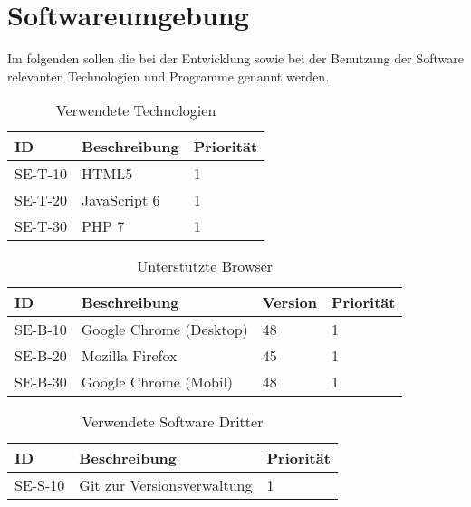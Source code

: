 
\chapter{Softwareumgebung}
Im folgenden sollen die bei der Entwicklung sowie bei der Benutzung der Software relevanten Technologien und Programme genannt werden.

\begin{table}[H]
\caption{Verwendete Technologien}
\label{softwareumgebung:technologien}
\begin{tabularx}{\textwidth}{|l|X|l|}
\toprule
\textbf{ID} & \textbf{Beschreibung} & \textbf{Priorität}\\
\endhead
\hline
SE-T-10 & HTML5 & 1 \\
SE-T-20 & JavaScript 6 & 1 \\
SE-T-30 & PHP 7 & 1\\
\hline
\end{tabularx}
\end{table}

\begin{table}[H]
\caption{Unterstützte Browser}
\label{softwareumgebung:browser}
\begin{tabularx}{\textwidth}{|l|l|l|l|}
\toprule
\textbf{ID} & \textbf{Beschreibung} & \textbf{Version} & \textbf{Priorität}\\
\endhead
\hline
SE-B-10 & Google Chrome (Desktop) & 48 & 1 \\
SE-B-20 & Mozilla Firefox & 45 & 1 \\
SE-B-30 & Google Chrome (Mobil) & 48 & 1\\
\hline
\end{tabularx}
\end{table}

\begin{table}[H]
\caption{Verwendete Software Dritter}
\label{softwareumgebung:sonstige}
\begin{tabularx}{\textwidth}{|l|X|l|}
\toprule
\textbf{ID} & \textbf{Beschreibung} & \textbf{Priorität}\\
\endhead
\hline
SE-S-10 & Git zur Versionsverwaltung & 1 \\
\hline
\end{tabularx}
\end{table}